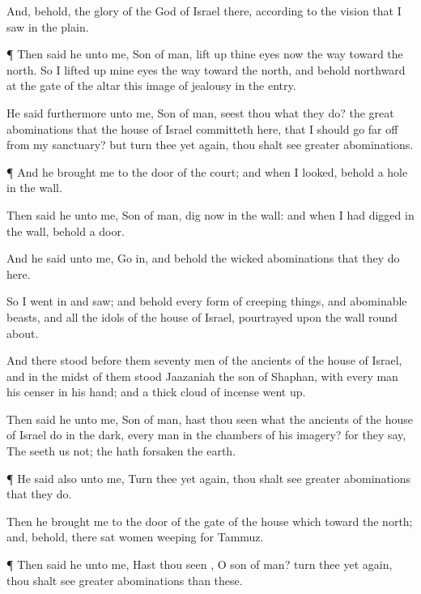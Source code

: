 {And, behold, the
glory of the
God of
Israel
{} there, according to the
vision that I
saw in the
plain.


\par }{\PP {}¶ Then
said he unto me,
Son of
man, lift
up thine
eyes now the
way toward the
north. So I lifted
up mine
eyes the
way toward the
north, and behold
northward at the
gate of the
altar this
image of
jealousy in the
entry.

He
said furthermore unto me,
Son of
man,
seest thou what they
do?
{} the
great
abominations that the
house of
Israel
committeth here, that I should go far
off from my
sanctuary? but
turn thee yet again,
{} thou shalt
see
greater
abominations.


\par }{\PP {}¶ And he
brought me to the
door of the
court; and when I
looked, behold
a
hole in the
wall.

Then
said he unto me,
Son of
man,
dig now in the
wall: and when I had
digged in the
wall, behold
a
door.

And he
said unto me, Go
in, and
behold the
wicked
abominations that they
do here.

So I went
in and
saw; and behold every
form of creeping
things, and
abominable
beasts, and all the
idols of the
house of
Israel,
pourtrayed upon the
wall round
about.

And there
stood
before them
seventy
men of the
ancients of the
house of
Israel, and in the
midst of them
stood
Jaazaniah the
son of
Shaphan, with every
man his
censer in his
hand; and a
thick
cloud of
incense went
up.

Then
said he unto me,
Son of
man, hast thou
seen what the
ancients of the
house of
Israel
do in the
dark, every
man in the
chambers of his
imagery? for they
say, The
{}
seeth us not; the
{} hath
forsaken the
earth.


\par }{\PP {}¶ He
said also unto me,
Turn thee yet again,
{} thou shalt
see
greater
abominations that they
do.

Then he
brought me to the
door of the
gate of the
{}
house which
{} toward the
north; and, behold, there
sat
women
weeping for
Tammuz.


\par }{\PP {}¶ Then
said he unto me, Hast thou
seen
{}, O
son of
man?
turn thee yet again,
{} thou shalt
see
greater
abominations than these.

}
